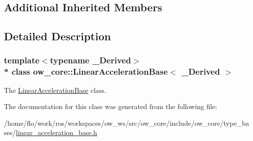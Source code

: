 \subsection*{Additional Inherited Members}


\subsection{Detailed Description}
\subsubsection*{template$<$typename \+\_\+\+Derived$>$\\*
class ow\+\_\+core\+::\+Linear\+Acceleration\+Base$<$ \+\_\+\+Derived $>$}

The \hyperlink{classow__core_1_1LinearAccelerationBase}{Linear\+Acceleration\+Base} class. 

The documentation for this class was generated from the following file\+:\begin{DoxyCompactItemize}
\item 
/home/flo/work/ros/workspaces/ow\+\_\+ws/src/ow\+\_\+core/include/ow\+\_\+core/type\+\_\+bases/\hyperlink{linear__acceleration__base_8h}{linear\+\_\+acceleration\+\_\+base.\+h}\end{DoxyCompactItemize}
